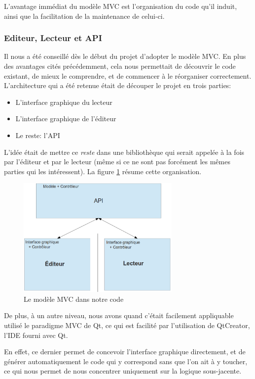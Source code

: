 L'avantage immédiat du modèle MVC est l'organisation du code qu'il induit, ainsi que la facilitation de la maintenance de celui-ci.

\subsubsection{Editeur, Lecteur et API}

Il nous a été conseillé dès le début du projet d'adopter le modèle MVC. En plus des avantages cités précédemment, cela nous permettait de découvrir le code existant, de mieux le comprendre, et de commencer à le réorganiser correctement. L'architecture qui a été retenue était de découper le projet en trois parties:
\begin{itemize}
 \item L'interface graphique du lecteur
 \item L'interface graphique de l'éditeur
 \item Le reste: l'API
\end{itemize}
L'idée était de mettre ce \textit{reste} dans une bibliothèque qui serait appelée à la fois par l'éditeur et par le lecteur (même si ce ne sont pas forcément les mêmes parties qui les intéressent). La figure \ref{mvc} résume cette organisation.

\begin{figure}[H]
\begin{center}
\includegraphics[width=300px]{mvc.png}
\caption{Le modèle MVC dans notre code}
\label{mvc}
\end{center}
\end{figure}


De plus, à un autre niveau, nous avons quand c'était facilement appliquable utilisé le paradigme MVC de Qt, ce qui est facilité
par l'utilisation de QtCreator, l'IDE fourni avec Qt.

En effet, ce dernier permet de concevoir l'interface graphique directement, et de générer automatiquement le code qui y
correspond sans que l'on ait à y toucher, ce qui nous permet de nous concentrer uniquement sur la logique sous-jacente.

